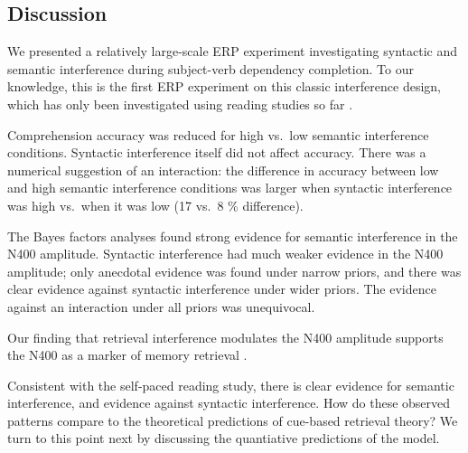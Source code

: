 \documentclass[a4paper, man, floatsintext]{apa7}
\begin{document}
\subsection{Discussion}
We presented a relatively large-scale ERP experiment investigating syntactic and semantic interference during subject-verb dependency completion. To our knowledge, this is the first ERP experiment on this classic interference design, which has only been investigated using reading studies so far \parencite{mertzen,vandyke07}. 

Comprehension accuracy was reduced for high vs.\ low semantic interference conditions. 
Syntactic interference itself did not affect accuracy. There was a numerical suggestion of an interaction: the difference in accuracy between low and high semantic interference conditions was larger when syntactic interference was high vs.\ when it was low (17 vs.\ 8 \% difference). 

The Bayes factors analyses found strong evidence for semantic interference in the N400 amplitude. Syntactic interference had much weaker evidence in the N400 amplitude; only anecdotal evidence was found under narrow priors, and there was clear evidence against syntactic interference under wider priors. The evidence against an interaction under all priors was unequivocal.

Our finding that retrieval interference modulates the N400 amplitude supports the N400 as a marker of memory retrieval \citep{kutas&federmeier_2000, kutas_federmeier2011, brouwer2017_n4_p6, lau2008_n400}.

Consistent with the self-paced reading study, there is clear evidence for semantic interference, and evidence against syntactic interference.  How do these observed patterns compare to the theoretical predictions of cue-based retrieval theory? We turn to this point next by discussing the quantiative predictions of the \textcite{Lewis2005} model.

\end{document}
